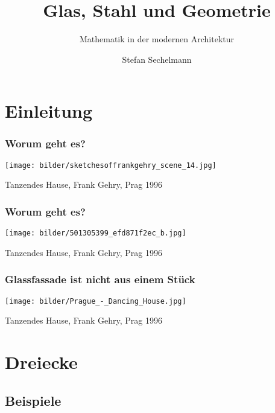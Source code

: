 \documentclass[12pt]{beamer}
\title{\vspace{-1cm}Glas, Stahl und Geometrie}
\subtitle{Mathematik in der modernen Architektur}
\author{Stefan Sechelmann}
\date
\begin{document}
\maketitle





\section{Einleitung}

\begin{frame}
\frametitle{Worum geht es?}
\begin{center}
\texttt{[image: bilder/sketchesoffrankgehry\_scene\_14.jpg]}\\	
\end{center}
\tiny{Tanzendes Hause, Frank Gehry, Prag 1996}
\end{frame}

\begin{frame}
\frametitle{Worum geht es?}
\begin{center}
\texttt{[image: bilder/501305399\_efd871f2ec\_b.jpg]} \\
\end{center}
\tiny{Tanzendes Hause, Frank Gehry, Prag 1996}
\end{frame}


\begin{frame}
\frametitle{Glassfassade ist nicht aus einem St\"uck}
\begin{center}
\texttt{[image: bilder/Prague\_-\_Dancing\_House.jpg]}
\end{center}
\tiny{Tanzendes Hause, Frank Gehry, Prag 1996}
\end{frame}


\section{Dreiecke}
\subsection{Beispiele}
\end{document}
